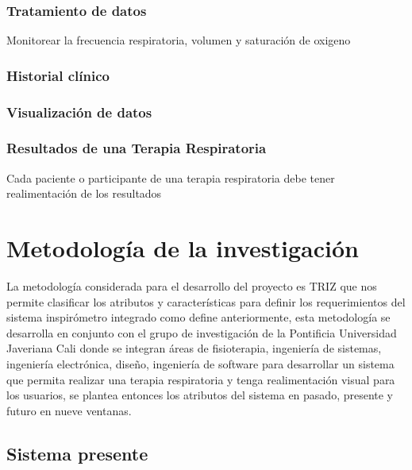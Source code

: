 \documentclass[12pt]{article}
\begin{document}
\subsubsection{Tratamiento de datos}

Monitorear la frecuencia respiratoria, volumen y saturación de oxigeno



\subsubsection{Historial clínico}


\subsubsection{Visualización de datos}

\subsubsection{Resultados de una Terapia Respiratoria}

Cada paciente o participante de una terapia respiratoria debe tener realimentación de los resultados 



\section{Metodología de la investigación}

La metodología considerada para el desarrollo del proyecto es TRIZ que nos permite clasificar los atributos y características para definir los requerimientos del sistema inspirómetro integrado como define anteriormente, esta metodología se desarrolla en conjunto con el grupo de investigación de la Pontificia Universidad Javeriana Cali donde se integran áreas de fisioterapia, ingeniería de sistemas, ingeniería electrónica, diseño, ingeniería de software para desarrollar un sistema que permita realizar una terapia respiratoria y tenga realimentación visual para los usuarios, se plantea entonces los atributos del sistema en pasado, presente y futuro en nueve ventanas.


\subsection{Sistema presente} 
\end{document}
